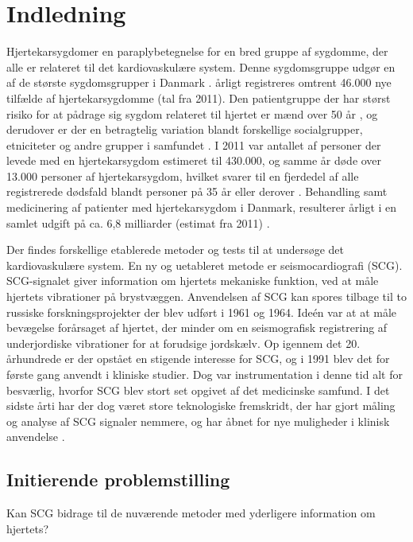 \chapter{Indledning} \label{Indledning}

\textquotedbl Hjertekarsygdom\textquotedbl er en paraplybetegnelse for en bred gruppe af sygdomme, der alle er relateret til det kardiovaskulære system. Denne sygdomsgruppe udgør en af de største sygdomsgrupper i Danmark \cite{livet}. årligt registreres omtrent 46.000 nye tilfælde af hjertekarsygdomme (tal fra 2011). Den patientgruppe der har størst risiko for at pådrage sig sygdom relateret til hjertet er mænd over 50 år \cite{2011}, og derudover er der en betragtelig variation blandt forskellige socialgrupper, etniciteter og andre grupper i samfundet \cite{hjerteforening}. I 2011 var antallet af personer der levede med en hjertekarsygdom estimeret til 430.000, og samme år døde over 13.000 personer af hjertekarsygdom, hvilket svarer til en fjerdedel af alle registrerede dødsfald blandt personer på 35 år eller derover \cite{2011}. Behandling samt medicinering af patienter med hjertekarsygdom i Danmark, resulterer årligt i en samlet udgift på ca. 6,8 milliarder (estimat fra 2011) \cite{hjerteforening}. 

Der findes forskellige etablerede metoder og tests til at undersøge det kardiovaskulære system. En ny og uetableret metode er seismocardiografi (SCG). SCG-signalet giver information om hjertets mekaniske funktion, ved at måle hjertets vibrationer på brystvæggen. Anvendelsen af SCG kan spores tilbage til to russiske forskningsprojekter der blev udført  i 1961 og 1964. Ideén var at at måle bevægelse forårsaget af hjertet, der minder om en seismografisk registrering af underjordiske vibrationer for at forudsige jordskælv. Op igennem det 20. århundrede er der opstået en stigende interesse for SCG, og i 1991 blev det for første gang anvendt i kliniske studier. Dog var instrumentation i denne tid alt for besværlig, hvorfor SCG blev stort set opgivet af det medicinske samfund. I det sidste årti har der dog været store teknologiske fremskridt, der har gjort måling og analyse af SCG signaler nemmere, og har åbnet for nye muligheder i klinisk anvendelse \cite{onan} \cite{zanetti}.

\section{Initierende problemstilling} Kan SCG bidrage til de nuværende metoder med yderligere information om hjertets?